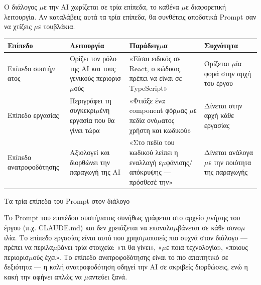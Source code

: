 


Ο διάλογος $\mu$ε την AI χωρίζεται σε τρία επίπεδα, το καθένα $\mu$ε διαφορετική λειτουργία. Αν καταλάβεις αυτά τα τρία επίπεδα, θα συνθέτεις αποδοτικά Prompt σαν να χτίζεις $\mu$ε τουβλάκια.

\begin{center}
\begin{tabularx}{\linewidth}{|X|X|X|X|}
\hline
\textbf{Επίπεδο} & \textbf{Λειτουργία} & \textbf{Παράδειγ$\mu$α} & \textbf{Συχνότητα} \tabularnewline
\hline
Επίπεδο συστή$\mu$ατος & Ορίζει τον ρόλο της AI και τους γενικούς περιορισ$\mu$ούς & «Είσαι ειδικός σε React, ο κώδικας πρέπει να είναι σε TypeScript» & Ορίζεται $\mu$ία φορά στην αρχή του έργου \tabularnewline
Επίπεδο εργασίας & Περιγράφει τη συγκεκρι$\mu$ένη εργασία που θα γίνει τώρα & «Φτιάξε ένα component φόρ$\mu$ας $\mu$ε πεδία ονό$\mu$ατος χρήστη και κωδικού» & Δίνεται στην αρχή κάθε εργασίας \tabularnewline
Επίπεδο ανατροφοδότησης & Αξιολογεί και διορθώνει την παραγωγή της AI & «Στο πεδίο του κωδικού λείπει η εναλλαγή ε$\mu$φάνισης/απόκρυψης — πρόσθεσέ την» & Δίνεται ανάλογα $\mu$ε την ποιότητα της παραγωγής \tabularnewline
\hline
\end{tabularx}
\end{center}

\begin{center}\small\color{gray}Τα τρία επίπεδα του Prompt στον διάλογο\end{center}

Το Prompt του επιπέδου συστή$\mu$ατος συνήθως γράφεται στο αρχείο $\mu$νή$\mu$ης του έργου (π.χ. CLAUDE.md) και δεν χρειάζεται να επαναλα$\mu$βάνεται σε κάθε συνο$\mu$ιλία. Το επίπεδο εργασίας είναι αυτό που χρησι$\mu$οποιείς πιο συχνά στον διάλογο — πρέπει να περιλα$\mu$βάνει τρία στοιχεία: «τι θα γίνει», «$\mu$ε ποια τεχνολογία», «ποιους περιορισ$\mu$ούς έχει». Το επίπεδο ανατροφοδότησης είναι το πιο απαιτητικό σε δεξιότητα — η καλή ανατροφοδότηση οδηγεί την AI σε ακριβείς διορθώσεις, ενώ η κακή την αφήνει απλώς να $\mu$αντεύει ξανά.

